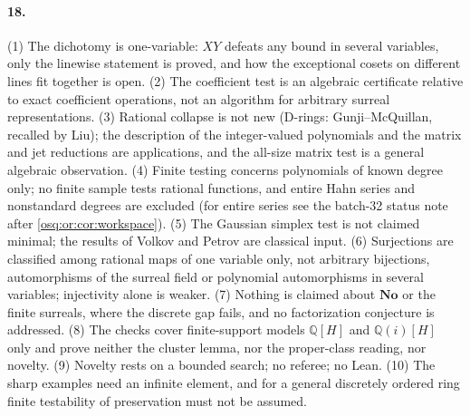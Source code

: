 \documentclass[11pt,letterpaper]{article}
\numberwithin{equation}{section}
\theoremstyle{definition}
\theoremstyle{remark}
\theoremstyle{plain}
\newcommand{\No}{\mathbf{No}}
\newcommand{\Q}{\mathbb Q}
\begin{document}
\paragraph{18.} (1) The dichotomy is one-variable: $XY$ defeats any bound in several variables, only the linewise statement is proved,
and how the exceptional cosets on different lines fit together is open. (2) The coefficient test is an algebraic certificate relative to
exact coefficient operations, not an algorithm for arbitrary surreal representations. (3) Rational collapse is not new (D-rings:
Gunji--McQuillan, recalled by Liu); the description of the integer-valued polynomials and the matrix and jet reductions are applications,
and the all-size matrix test is a general algebraic observation. (4) Finite testing concerns polynomials of known degree only; no finite
sample tests rational functions, and entire Hahn series and nonstandard degrees are excluded (for entire series see the batch-32
status note after \cref{osq:or:cor:workspace}). (5) The Gaussian simplex test is not
claimed minimal; the results of Volkov and Petrov are classical input. (6) Surjections are classified among rational maps of one
variable only, not arbitrary bijections, automorphisms of the surreal field or polynomial automorphisms in several variables;
injectivity alone is weaker. (7) Nothing is claimed about $\No$ or the finite surreals, where the discrete gap fails, and no
factorization conjecture is addressed. (8) The checks cover finite-support models $\Q[H]$ and $\Q(i)[H]$ only and prove neither the cluster
lemma, nor the proper-class reading, nor novelty. (9) Novelty rests on a bounded search; no referee; no Lean. (10) The sharp examples need
an infinite element, and for a general discretely ordered ring finite testability of preservation must not be assumed.
\end{document}
